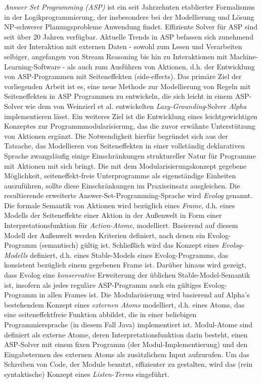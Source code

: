 \documentclass[draft,final]{vutinfth} %
\theoremstyle{definition}
\begin{document}
\begin{kurzfassung}
  \emph{Answer Set Programming (ASP)} ist ein seit Jahrzehnten etablierter Formalismus in der Logikprogrammierung, der insbesondere bei der Modellierung und Lösung NP-schwerer Planungsprobleme Anwendung findet. Effiziente Solver für ASP sind seit über 20 Jahren verfügbar. Aktuelle Trends in ASP befassen sich zunehmend mit der Interaktion mit externen Daten - sowohl zum Lesen und Verarbeiten selbiger, angefangen von Stream Reasoning bis hin zu Interaktionen mit Machine-Learning-Software - als auch zum Ausführen von Aktionen, d.h. der Entwicklung von ASP-Programmen mit Seiteneffekten (side-effects). Das primäre Ziel der vorliegenden Arbeit ist es, eine neue Methode zur Modellierung von Regeln mit Seiteneffekten in ASP Programmen zu entwickeln, die sich leicht in einem ASP-Solver wie dem von Weinzierl et al. entwickelten \emph{Lazy-Grounding}-Solver \emph{Alpha} implementieren lässt. Ein weiteres Ziel ist die Entwicklung eines leichtgewichtigen Konzeptes zur Programmmodularisierung, das die zuvor erwähnte Unterstützung von Aktionen ergänzt. Die Notwendigkeit hierfür begründet sich aus der Tatsache, das Modellieren von Seiteneffekten in einer vollständig deklarativen Sprache zwangsläufig einige Einschränkungen struktureller Natur für Programme mit Aktionen mit sich bringt. Die mit dem Modularisierungskonzept gegebene Möglichkeit, seiteneffekt-freie Unterprogramme als eigenständige Einheiten auszuführen, sollte diese Einschränkungen im Praxiseinsatz ausgleichen. Die resultierende erweiterte Answer-Set-Programming-Sprache wird \emph{Evolog} genannt.
  Die formale Semantik von Aktionen wird bezüglich eines \emph{Frame}, d.h. eines Modells der Seiteneffekte einer Aktion in der Außenwelt in Form einer Interpretationsfunktion für \emph{Action-Atome}, modelliert. Basierend auf diesem Modell der Außenwelt werden Kriterien definiert, nach denen ein Evolog-Programm (semantisch) gültig ist. Schließlich wird das Konzept eines \emph{Evolog-Modells} definiert, d.h. eines Stable-Models eines Evolog-Programms, das konsistent bezüglich einem gegebenen Frame ist. Darüber hinaus wird gezeigt, dass Evolog eine \emph{konservative} Erweiterung der üblichen Stable-Model-Semantik ist, insofern als jedes reguläre ASP-Programm auch ein gültiges Evolog-Programm in allen Frames ist.
  Die Modularisierung wird basierend auf Alpha's bestehendem Konzept eines \emph{externen Atoms} modelliert, d.h. eines Atoms, das eine seiteneffektfreie Funktion abbildet, die in einer beliebigen Programmiersprache (in diesem Fall Java) implementiert ist. Modul-Atome sind definiert als externe Atome, deren Interpretationsfunktion darin besteht, einen ASP-Solver mit einem fixen Programm (der Modul-Implementierung) und den Eingabetermen des externen Atoms als zusätzlichem Input aufzurufen. Um das Schreiben von Code, der Module benutzt, effizienter zu gestalten, wird das (rein syntaktische) Konzept eines \emph{Listen-Terms} eingeführt.

\end{kurzfassung}
\end{document}
